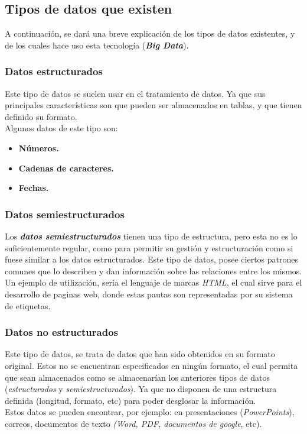 \documentclass[11pt]{diazessay} %
\begin{document}
\subsection*{Tipos de datos que existen}
A continuación, se dará una breve explicación de los tipos de datos existentes, y de los cuales hace uso esta tecnología (\textbf{\textit{Big Data}}).

\subsubsection*{Datos estructurados}
Este tipo de datos se suelen usar en el tratamiento de datos. Ya que sus principales características son que pueden ser almacenados en tablas, y que tienen definido su formato.\\
Algunos datos de este tipo son:

\begin{itemize}
	\item \textbf{Números.}
	\item \textbf{Cadenas de caracteres.}
	\item \textbf{Fechas.}
\end{itemize}

\subsubsection*{Datos semiestructurados}
Los \textbf{\textit{datos semiestructurados}} tienen una tipo de estructura, pero esta no es lo suficientemente regular, como para permitir su gestión y estructuración como si fuese similar a los datos estructurados.
Este tipo de datos, posee ciertos patrones comunes que lo describen y dan información sobre las relaciones entre los mismos.\\
Un ejemplo de utilización, sería el lenguaje de marcas \textit{HTML}, el cual sirve para el desarrollo de paginas web, donde estas pautas son representadas por su sistema de etiquetas.

\subsubsection*{Datos no estructurados}
Este tipo de datos, se trata  de datos que han sido obtenidos en su formato original. Estos no se encuentran especificados en ningún formato, el cual permita que sean almacenados como se almacenarían los anteriores tipos de datos (\textit{estructurados} y \textit{semiestructurados}). Ya que no disponen de una estructura definida (longitud, formato, etc) para poder desglosar la información.\\
Estos datos se pueden encontrar, por ejemplo: en presentaciones (\textit{PowerPoints}), correos, documentos de texto \textit{(Word, PDF, documentos de google}, etc).
\end{document}
